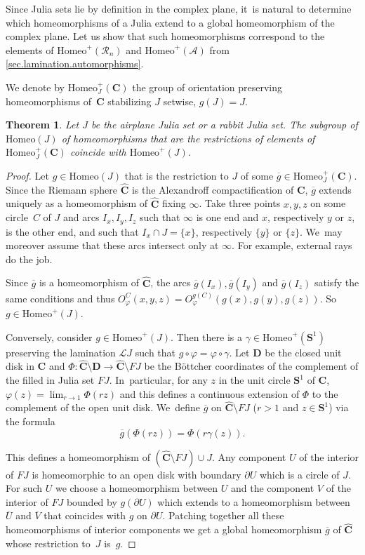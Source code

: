 \documentclass[JEP,XML,SOM,Unicode,NoFloatCountersInSection,published]{cedram}
\theoremstyle{plain}
\newtheorem{theorem}{Theorem}[section]
\theoremstyle{definition}
\theoremstyle{remark}
\newcommand{\Homeo}{\mathrm{Homeo}}
\newcommand{\A}{\mathcal{A}}
\newcommand{\R}{\mathcal{R}}
\newcommand{\C}{\mathbf{C}}
\begin{document}
Since Julia sets lie by definition in the complex plane, it~is natural to determine which homeomorphisms of a Julia extend to a global homeomorphism of the complex plane.
Let us show that such homeomorphisms correspond to the elements of $\Homeo^+(\R_n)$ and $\Homeo^+(\A)$ from \cref{sec.lamination.automorphisms}.

We denote by $\Homeo^+_J(\C)$ the group of orientation preserving homeomorphisms of~$\C$ stabilizing $J$ setwise, \ie $g(J)=J$.

\begin{theorem}
Let $J$ be the airplane Julia set or a rabbit Julia set. The subgroup of $\Homeo(J)$ of homeomorphisms that are the restrictions of elements of $\Homeo^+_J(\C)$ coincide with $\Homeo^+(J)$.
\end{theorem}

\begin{proof} Let $g\in \Homeo(J)$ that is the restriction to $J$ of some $\overline{g}\in\Homeo^+_J(\C)$. Since the Riemann sphere $\hat{\C}$ is the Alexandroff compactification of $\C$, $\overline{g}$ extends uniquely as a homeomorphism of $\hat{\C}$ fixing $\infty$. Take three points $x,y,z$ on some circle~$C$ of $J$ and arcs $I_x,I_y,I_z$ such that $\infty$ is one end and $x$, respectively $y$ or $z$, is the other end, and such that $I_x\cap J=\{x\}$, respectively $\{y\}$ or $\{z\}$. We~may moreover assume that these arcs intersect only at $\infty$. For example, external rays do the job.

Since $\overline{g}$ is a homeomorphism of $\hat{\C}$, the arcs $\overline{g}(I_x),\overline{g}(I_y)$ and $\overline{g}(I_z)$ satisfy the same conditions and thus $O^C_\varphi(x,y,z)=O^{g(C)}_\varphi(g(x),g(y),g(z))$. So $g\in \Homeo^+(J)$.

Conversely, consider $g\in\Homeo^+(J)$.
Then there is a $\gamma\in\Homeo^+(\mathbf{S}^1)$ preserving the lamination $\mathcal{L}J$ such that $g\circ\varphi=\varphi\circ\gamma$. Let $\mathbf{D}$ be the closed unit disk in $\C$ and $\Phi\colon\hat{\C}\setminus\mathbf{D}\to\hat{\C}\setminus FJ$ be the Böttcher coordinates of the complement of the filled in Julia set $FJ$. In~particular, for any $z$ in the unit circle $\mathbf{S}^1$ of $\C$, $\varphi(z)=\lim_{r\to1}\Phi(rz)$ and this defines a continuous extension of $\Phi$ to the complement of the open unit disk. We~define $\overline{g}$ on $\hat{\C}\setminus FJ$ ($r>1$ and $z\in\mathbf{S}^1$) via the formula
\[
\overline{g}(\Phi(rz))=\Phi(r\gamma(z)).
\]

This defines a homeomorphism of $(\hat{\C}\setminus FJ)\cup J$. Any component $U$ of the interior of $FJ$ is homeomorphic to an open disk with boundary $\partial U$ which is a circle of $J$. For such $U$ we choose a homeomorphism between $U$ and the component $V$ of the interior of $FJ$ bounded by $g(\partial U)$ which extends to a homeomorphism between $\overline{U}$ and $\overline{V}$ that coincides with $g$ on $\partial U$. Patching together all these homeomorphisms of interior components we get a global homeomorphism $\overline{g}$ of $\hat{\C}$ whose restriction to~$J$ is~$g$.
\end{proof}
\end{document}
